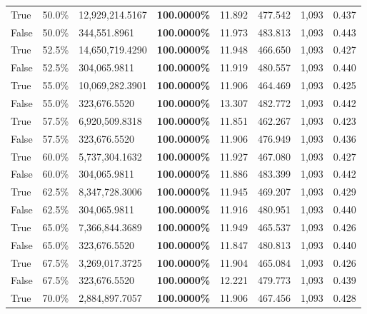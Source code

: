 \begin{table}[H]
\begin{tabular}{lllrllll}
\cline{1-8}
True & 50.0\% & 12,929,214.5167 & \bfseries \color{red} 100.0000\% & 11.892 & 477.542 & 1,093 & 0.437 \\
\cline{1-8}
False & 50.0\% & 344,551.8961 & \bfseries \color{red} 100.0000\% & 11.973 & 483.813 & 1,093 & 0.443 \\
\cline{1-8}
True & 52.5\% & 14,650,719.4290 & \bfseries \color{red} 100.0000\% & 11.948 & 466.650 & 1,093 & 0.427 \\
\cline{1-8}
False & 52.5\% & 304,065.9811 & \bfseries \color{red} 100.0000\% & 11.919 & 480.557 & 1,093 & 0.440 \\
\cline{1-8}
True & 55.0\% & 10,069,282.3901 & \bfseries \color{red} 100.0000\% & 11.906 & 464.469 & 1,093 & 0.425 \\
\cline{1-8}
False & 55.0\% & 323,676.5520 & \bfseries \color{red} 100.0000\% & 13.307 & 482.772 & 1,093 & 0.442 \\
\cline{1-8}
True & 57.5\% & 6,920,509.8318 & \bfseries \color{red} 100.0000\% & 11.851 & 462.267 & 1,093 & 0.423 \\
\cline{1-8}
False & 57.5\% & 323,676.5520 & \bfseries \color{red} 100.0000\% & 11.906 & 476.949 & 1,093 & 0.436 \\
\cline{1-8}
True & 60.0\% & 5,737,304.1632 & \bfseries \color{red} 100.0000\% & 11.927 & 467.080 & 1,093 & 0.427 \\
\cline{1-8}
False & 60.0\% & 304,065.9811 & \bfseries \color{red} 100.0000\% & 11.886 & 483.399 & 1,093 & 0.442 \\
\cline{1-8}
True & 62.5\% & 8,347,728.3006 & \bfseries \color{red} 100.0000\% & 11.945 & 469.207 & 1,093 & 0.429 \\
\cline{1-8}
False & 62.5\% & 304,065.9811 & \bfseries \color{red} 100.0000\% & 11.916 & 480.951 & 1,093 & 0.440 \\
\cline{1-8}
True & 65.0\% & 7,366,844.3689 & \bfseries \color{red} 100.0000\% & 11.949 & 465.537 & 1,093 & 0.426 \\
\cline{1-8}
False & 65.0\% & 323,676.5520 & \bfseries \color{red} 100.0000\% & 11.847 & 480.813 & 1,093 & 0.440 \\
\cline{1-8}
True & 67.5\% & 3,269,017.3725 & \bfseries \color{red} 100.0000\% & 11.904 & 465.084 & 1,093 & 0.426 \\
\cline{1-8}
False & 67.5\% & 323,676.5520 & \bfseries \color{red} 100.0000\% & 12.221 & 479.773 & 1,093 & 0.439 \\
\cline{1-8}
True & 70.0\% & 2,884,897.7057 & \bfseries \color{red} 100.0000\% & 11.906 & 467.456 & 1,093 & 0.428 \\

\end{tabular}
\end{table}
